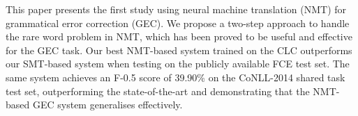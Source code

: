 This paper presents the first study using neural machine translation (NMT) for grammatical error correction (GEC). We propose a two-step approach to handle the rare word problem in NMT, which has been proved to be useful and effective for the GEC task. Our best NMT-based system trained on the CLC outperforms our SMT-based system when testing on the publicly available FCE test set. The same system achieves an F-0.5 score of 39.90\% on the CoNLL-2014 shared task test set, outperforming the state-of-the-art and demonstrating that the NMT-based GEC system generalises effectively.

